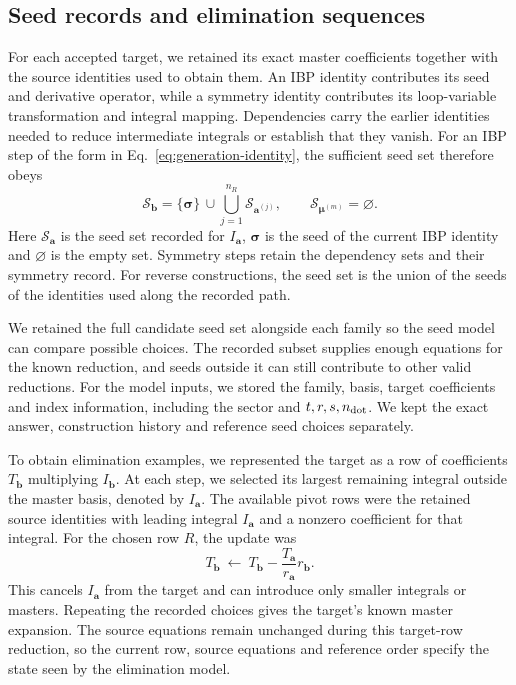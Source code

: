 \documentclass[11pt,a4paper]{article}
\begin{document}
\subsection{Seed records and elimination sequences}
For each accepted target, we retained its exact master coefficients
together with the source identities used to obtain them. An IBP
identity contributes its seed and derivative operator, while a
symmetry identity contributes its loop-variable transformation and
integral mapping. Dependencies carry the earlier identities needed
to reduce intermediate integrals or establish that they vanish.
For an IBP step of the form in Eq.~\eqref{eq:generation-identity},
the sufficient seed set therefore obeys
\begin{equation}
 \mathcal S_{\boldsymbol b}
 =\{\boldsymbol\sigma\}\,\cup\!
   \bigcup_{j=1}^{n_R}\mathcal S_{\boldsymbol a^{(j)}},
 \qquad
 \mathcal S_{\boldsymbol\mu^{(m)}}=\varnothing.
 \label{eq:generated-seed-record}
\end{equation}
Here $\mathcal S_{\boldsymbol a}$ is the seed set recorded for
$I_{\boldsymbol a}$, $\boldsymbol\sigma$ is the seed of the current
IBP identity and $\varnothing$ is the empty set. Symmetry steps retain
the dependency sets and their symmetry record. For reverse
constructions, the seed set is the union of the seeds of the identities
used along the recorded path.

We retained the full candidate seed set alongside each family so the
seed model can compare possible choices. The recorded subset supplies
enough equations for the known reduction, and seeds outside it can
still contribute to other valid reductions. For the model inputs,
we stored the family, basis, target coefficients and index information,
including the sector and $t,r,s,n_{\rm dot}$. We kept the exact answer,
construction history and reference seed choices separately.

To obtain elimination examples, we represented the target as a row
of coefficients $T_{\boldsymbol b}$ multiplying $I_{\boldsymbol b}$.
At each step, we selected its largest remaining integral outside the
master basis, denoted by $I_{\boldsymbol a}$. The available pivot rows
were the retained source identities with leading integral
$I_{\boldsymbol a}$ and a nonzero coefficient for that integral.
For the chosen row $R$, the update was
\begin{equation}
 T_{\boldsymbol b}\ \longleftarrow\
 T_{\boldsymbol b}
 -\frac{T_{\boldsymbol a}}{r_{\boldsymbol a}}r_{\boldsymbol b}.
 \label{eq:target-elimination-update}
\end{equation}
This cancels $I_{\boldsymbol a}$ from the target and can introduce only
smaller integrals or masters. Repeating the recorded choices gives
the target's known master expansion. The source equations remain
unchanged during this target-row reduction, so the current row,
source equations and reference order specify the state seen by
the elimination model.
\end{document}
